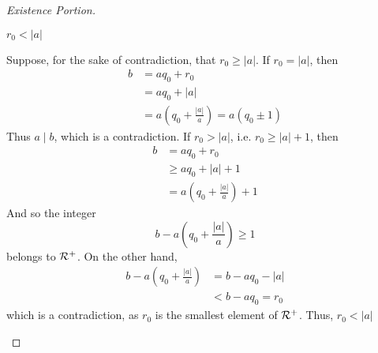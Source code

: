 \documentclass{scrartcl}
\begin{document}
\begin{proof}[Existence Portion]
  \begin{claim*}
    $r_0 < |a|$
  \end{claim*}
  \begin{subproof}
    Suppose, for the sake of contradiction, that $r_0 \geq |a|$. If $r_0 = |a|$, then
    \begin{align*}
      b &= aq_0 + r_0 \\
      &= aq_0 + |a| \\
      &= a\left(q_0 + \frac{|a|}{a}\right) = a\left(q_0 \pm 1\right)
    \end{align*}
    Thus $a \mid b$, which is a contradiction. If $r_0 > |a|$, i.e. $r_0 \geq |a| + 1$, then
    \begin{align*}
      b &= aq_0 + r_0 \\
      & \geq aq_0 + |a| + 1 \\
      &= a\left(q_0 + \frac{|a|}{a}\right) + 1
    \end{align*}
    And so the integer
    \begin{equation*}
      b - a\left(q_0 + \frac{|a|}{a}\right) \geq 1
    \end{equation*}
    belongs to $\mathcal{R}^{+}$. On the other hand,
    \begin{align*}
      b - a\left(q_0 + \frac{|a|}{a}\right) &= b - aq_0 - |a| \\
      &< b - aq_0 = r_0
    \end{align*}
    which is a contradiction, as $r_0$ is the smallest element of $\mathcal{R}^{+}$. Thus, $r_0 < |a|$
  \end{subproof}
\end{proof}
\end{document}
